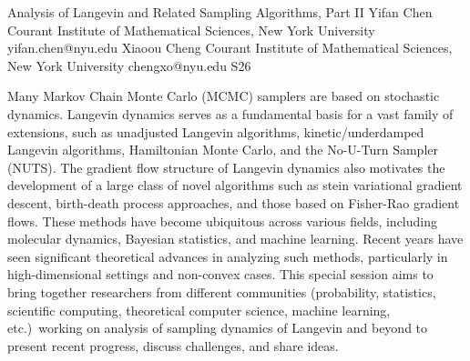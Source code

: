 

\clearpage

\begin{session}
 {Analysis of Langevin and Related Sampling Algorithms, Part II}%
 {Yifan Chen}%
 {Courant Institute of Mathematical Sciences, New York University}%
 {yifan.chen@nyu.edu}%
 {Xiaoou Cheng}%
 {Courant Institute of Mathematical Sciences, New York University}%
 {chengxo@nyu.edu}%
 {S26}%
 {}%

 {}
 Many Markov Chain Monte Carlo (MCMC) samplers are based on stochastic dynamics. Langevin dynamics serves as a fundamental basis for a vast family of extensions, such as unadjusted Langevin algorithms, kinetic/underdamped Langevin algorithms, Hamiltonian Monte Carlo, and the No-U-Turn Sampler (NUTS). The gradient flow structure of Langevin dynamics also motivates the development of a large class of novel algorithms such as stein variational gradient descent, birth-death process approaches, and those based on Fisher-Rao gradient flows. These methods have become ubiquitous across various fields, including molecular dynamics, Bayesian statistics, and machine learning. Recent years have seen significant theoretical advances in analyzing such methods, particularly in high-dimensional settings and non-convex cases. This special session aims to bring together researchers from different communities (probability, statistics, scientific computing, theoretical computer science, machine learning, etc.)\ working on analysis of sampling dynamics of Langevin and beyond to present recent progress, discuss challenges, and share ideas.
\end{session}



\clearpage

